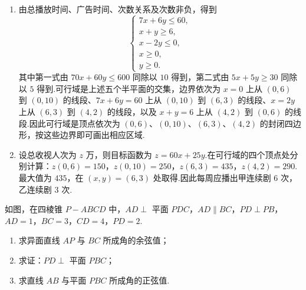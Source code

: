 \begin{solution}
\begin{enumerate}
\item 由总播放时间、广告时间、次数关系及次数非负，得到
\[
\begin{cases}
7x+6y\le60,\\
x+y\ge6,\\
x-2y\le0,\\
x\ge0,\\
y\ge0.
\end{cases}
\]
其中第一式由 \(70x+60y\le600\) 同除以 \(10\) 得到，第二式由 \(5x+5y\ge30\) 同除以 \(5\) 得到.可行域是上述五个半平面的交集，边界依次为 \(x=0\) 上从 \((0,6)\) 到 \((0,10)\) 的线段、\(7x+6y=60\) 上从 \((0,10)\) 到 \((6,3)\) 的线段、\(x=2y\) 上从 \((6,3)\) 到 \((4,2)\) 的线段，以及 \(x+y=6\) 上从 \((4,2)\) 到 \((0,6)\) 的线段.因此可行域是顶点依次为 \((0,6)\)、\((0,10)\)、\((6,3)\)、\((4,2)\) 的封闭四边形，按这些边界即可画出相应区域.

\item 设总收视人次为 \(z\) 万，则目标函数为 \(z=60x+25y\).在可行域的四个顶点处分别计算：\(z(0,6)=150\)，\(z(0,10)=250\)，\(z(6,3)=435\)，\(z(4,2)=290\).最大值为 \(435\)，在 \((x,y)=(6,3)\) 处取得.因此每周应播出甲连续剧 \(6\) 次，乙连续剧 \(3\) 次.
\end{enumerate}
\end{solution}

\begin{problem}
如图，在四棱锥 \(P-ABCD\) 中，\(AD\perp\) 平面 \(PDC\)，\(AD\parallel BC\)，\(PD\perp PB\)，\(AD=1\)，\(BC=3\)，\(CD=4\)，\(PD=2\).

\begin{enumerate}
\item 求异面直线 \(AP\) 与 \(BC\) 所成角的余弦值；
\item 求证：\(PD\perp\) 平面 \(PBC\)；
\item 求直线 \(AB\) 与平面 \(PBC\) 所成角的正弦值.
\end{enumerate}

\end{problem}

